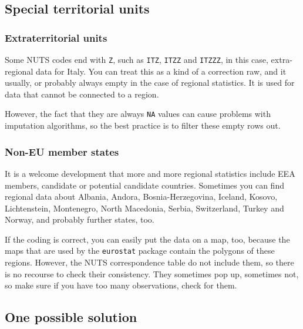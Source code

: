 \documentclass[]{article}
\begin{document}
\hypertarget{special-territorial-units}{%
\subsection{Special territorial units}\label{special-territorial-units}}

\hypertarget{extraterritorial-units}{%
\subsubsection{Extraterritorial units}\label{extraterritorial-units}}

Some NUTS codes end with \texttt{Z}, such as \texttt{ITZ}, \texttt{ITZZ}
and \texttt{ITZZZ}, in this case, extra-regional data for Italy. You can
treat this as a kind of a correction raw, and it usually, or probably
always empty in the case of regional statistics. It is used for data
that cannot be connected to a region.

However, the fact that they are always \texttt{NA} values can cause
problems with imputation algorithms, so the best practice is to filter
these empty rows out.

\hypertarget{non-eu-member-states}{%
\subsubsection{Non-EU member states}\label{non-eu-member-states}}

It is a welcome development that more and more regional statistics
include EEA members, candidate or potential candidate countries.
Sometimes you can find regional data about Albania, Andora,
Bosnia-Herzegovina, Iceland, Kosovo, Lichtenstein, Montenegro, North
Macedonia, Serbia, Switzerland, Turkey and Norway, and probably further
states, too.

If the coding is correct, you can easily put the data on a map, too,
because the maps that are used by the \texttt{eurostat} package contain
the polygons of these regions. However, the NUTS correspondence table do
not include them, so there is no recourse to check their consistency.
They sometimes pop up, sometimes not, so make sure if you have too many
observations, check for them.

\hypertarget{one-possible-solution}{%
\subsection{One possible solution}\label{one-possible-solution}}
\end{document}
